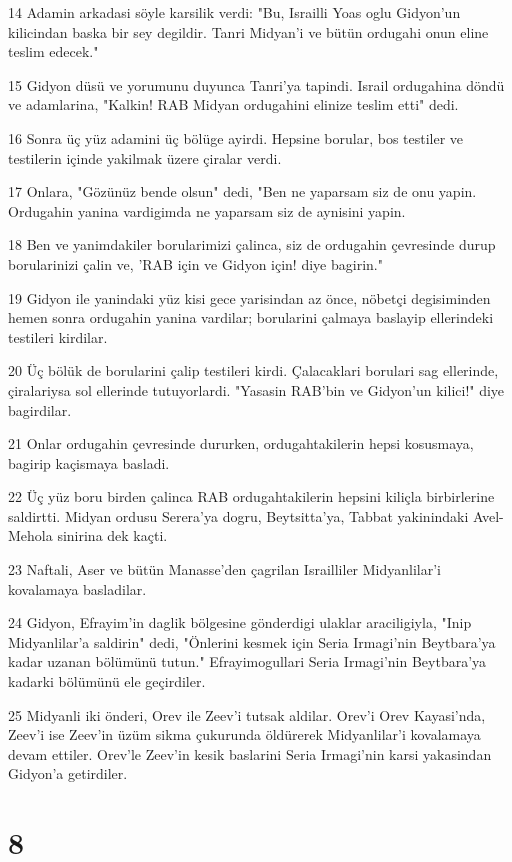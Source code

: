 \par 14 Adamin arkadasi söyle karsilik verdi: "Bu, Israilli Yoas oglu Gidyon'un kilicindan baska bir sey degildir. Tanri Midyan'i ve bütün ordugahi onun eline teslim edecek."
\par 15 Gidyon düsü ve yorumunu duyunca Tanri'ya tapindi. Israil ordugahina döndü ve adamlarina, "Kalkin! RAB Midyan ordugahini elinize teslim etti" dedi.
\par 16 Sonra üç yüz adamini üç bölüge ayirdi. Hepsine borular, bos testiler ve testilerin içinde yakilmak üzere çiralar verdi.
\par 17 Onlara, "Gözünüz bende olsun" dedi, "Ben ne yaparsam siz de onu yapin. Ordugahin yanina vardigimda ne yaparsam siz de aynisini yapin.
\par 18 Ben ve yanimdakiler borularimizi çalinca, siz de ordugahin çevresinde durup borularinizi çalin ve, 'RAB için ve Gidyon için! diye bagirin."
\par 19 Gidyon ile yanindaki yüz kisi gece yarisindan az önce, nöbetçi degisiminden hemen sonra ordugahin yanina vardilar; borularini çalmaya baslayip ellerindeki testileri kirdilar.
\par 20 Üç bölük de borularini çalip testileri kirdi. Çalacaklari borulari sag ellerinde, çiralariysa sol ellerinde tutuyorlardi. "Yasasin RAB'bin ve Gidyon'un kilici!" diye bagirdilar.
\par 21 Onlar ordugahin çevresinde dururken, ordugahtakilerin hepsi kosusmaya, bagirip kaçismaya basladi.
\par 22 Üç yüz boru birden çalinca RAB ordugahtakilerin hepsini kiliçla birbirlerine saldirtti. Midyan ordusu Serera'ya dogru, Beytsitta'ya, Tabbat yakinindaki Avel-Mehola sinirina dek kaçti.
\par 23 Naftali, Aser ve bütün Manasse'den çagrilan Israilliler Midyanlilar'i kovalamaya basladilar.
\par 24 Gidyon, Efrayim'in daglik bölgesine gönderdigi ulaklar araciligiyla, "Inip Midyanlilar'a saldirin" dedi, "Önlerini kesmek için Seria Irmagi'nin Beytbara'ya kadar uzanan bölümünü tutun." Efrayimogullari Seria Irmagi'nin Beytbara'ya kadarki bölümünü ele geçirdiler.
\par 25 Midyanli iki önderi, Orev ile Zeev'i tutsak aldilar. Orev'i Orev Kayasi'nda, Zeev'i ise Zeev'in üzüm sikma çukurunda öldürerek Midyanlilar'i kovalamaya devam ettiler. Orev'le Zeev'in kesik baslarini Seria Irmagi'nin karsi yakasindan Gidyon'a getirdiler.

\chapter{8}

